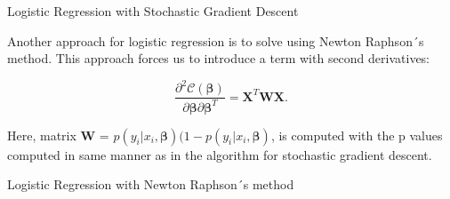 \documentclass{article}
\begin{document}
\begin{algorithm}
  \caption{\label{alg:sgd}Logistic Regression with Stochastic Gradient Descent}
\end{algorithm}

Another approach for logistic regression is to solve using Newton Raphson´s method. This approach forces us to introduce a term with second derivatives: 

    \[
\frac{\partial^2 \mathcal{C}(\boldsymbol{\beta})}{\partial \boldsymbol{\beta}\partial \boldsymbol{\beta}^T} = \boldsymbol{X}^T\boldsymbol{W}\boldsymbol{X}.
\]

Here, matrix $\boldsymbol{W}$ = $p(y_i\vert x_i,\boldsymbol{\beta})(1-p(y_i\vert x_i,\boldsymbol{\beta})$, is computed with the p values computed in same manner as in the algorithm for stochastic gradient descent.  

\begin{algorithm}
  \caption{\label{alg:sgd}Logistic Regression with Newton Raphson´s method}
\end{algorithm}
\end{document}
